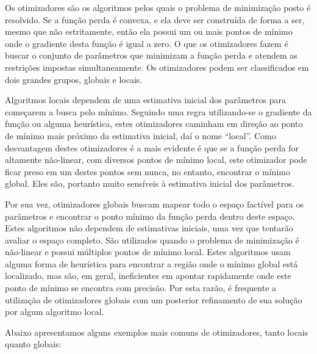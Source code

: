 \documentclass[]{book}
\begin{document}
Os otimizadores são os algoritmos pelos quais o problema de minimização
posto é resolvido. Se a função perda é convexa, e ela deve ser
construída de forma a ser, mesmo que não estritamente, então ela possui
um ou mais pontos de mínimo onde o gradiente desta função é igual a
zero. O que os otimizadores fazem é buscar o conjunto de parâmetros que
minimizam a função perda e atendem as restrições impostas
simultaneamente. Os otimizadores podem ser classificados em dois grandes
grupos, globais e locais.

Algoritmos locais dependem de uma estimativa inicial dos parâmetros para
começarem a busca pelo mínimo. Seguindo uma regra utilizando-se o
gradiente da função ou alguma heurística, estes otimizadores caminham em
direção ao ponto de mínimo mais próximo da estimativa inicial, daí o
nome ``local''. Como desvantagem destes otimizadores é a mais evidente é
que se a função perda for altamente não-linear, com diversos pontos de
mínimo local, este otimizador pode ficar preso em um destes pontos sem
nunca, no entanto, encontrar o mínimo global. Eles são, portanto muito
sensíveis à estimativa inicial dos parâmetros.

Por sua vez, otimizadores globais buscam mapear todo o espaço factível
para os parâmetros e encontrar o ponto mínimo da função perda dentro
deste espaço. Estes algoritmos não dependem de estimativas iniciais, uma
vez que tentarão avaliar o espaço completo. São utilizados quando o
problema de minimização é não-linear e possui múltiplos pontos de mínimo
local. Estes algoritmos usam alguma forma de heurística para encontrar a
região onde o mínimo global está localizado, mas são, em geral,
ineficientes em apontar rapidamente onde este ponto de mínimo se
encontra com precisão. Por esta razão, é frequente a utilização de
otimizadores globais com um posterior refinamento de sua solução por
algum algoritmo local.

Abaixo apresentamos alguns exemplos mais comuns de otimizadores, tanto
locais quanto globais:
\end{document}
